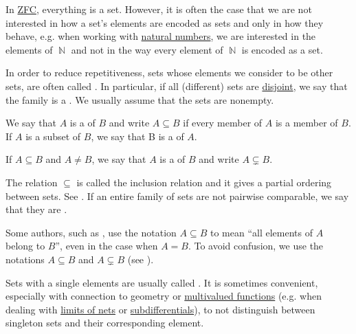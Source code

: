 \begin{remark}\label{rem:family_of_sets}
  In \hyperref[def:zfc]{ZFC}, everything is a set. However, it is often the case that we are not interested in how a set's elements are encoded as sets and only in how they behave, e.g. when working with \hyperref[def:set_of_natural_numbers]{natural numbers}, we are interested in the elements of \( \BbbN \) and not in the way every element of \( \BbbN \) is encoded as a set.

  In order to reduce repetitiveness, sets whose elements we consider to be other sets, are often called . In particular, if all (different) sets are \hyperref[def:subset]{disjoint}, we say that the family is a . We usually assume that the sets are nonempty.
\end{remark}

\begin{definition}\label{def:subset}
  We say that \( A \) is a  of \( B \) and write \( A \subseteq B \) if every member of \( A \) is a member of \( B \). If \( A \) is a subset of \( B \), we say that B is a  of \( A \).

  If \( A \subseteq B \) and \( A \neq B \), we say that \( A \) is a  of \( B \) and write \( A \subsetneq B \).

  The relation \( \subseteq \) is called the inclusion relation and it gives a partial ordering between sets. See . If an entire family of sets are not pairwise comparable, we say that they are .
\end{definition}

\begin{remark}\label{rem:subset_notation}
  Some authors, such as \cite{Kelley1955}, use the notation \( A \subseteq B \) to mean \enquote{all elements of \( A \) belong to \( B \)}, even in the case when \( A = B \). To avoid confusion, we use the notations \( A \subseteq B \) and \( A \subsetneq B \) (see ).
\end{remark}

\begin{remark}\label{rem:singleton_sets}
  Sets with a single elements are usually called . It is sometimes convenient, especially with connection to geometry or \hyperref[def:function/multivalued]{multivalued functions} (e.g. when dealing with \hyperref[def:net_convergence/limit]{limits of nets} or \hyperref[def:subdifferentials]{subdifferentials}), to not distinguish between singleton sets and their corresponding element.
\end{remark}

